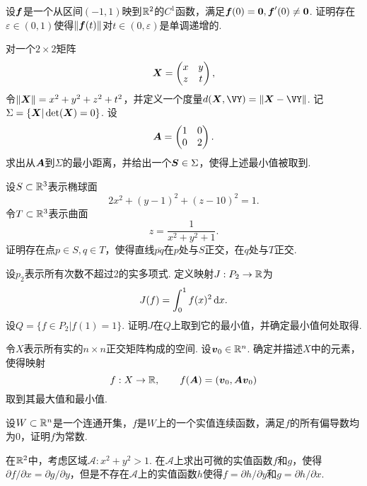 \documentclass[openany,usenames,dvipsnames]{ctexbook}
\begin{document}
\begin{example}
  设$\boldsymbol f$是一个从区间$(-1,1)$映到$\mathbb R^2$的$C^1$函数，满足$\boldsymbol f(0)=\boldsymbol 0,\boldsymbol f'(0)\ne\boldsymbol 0$. 证明存在$\varepsilon\in(0,1)$使得$\|\boldsymbol f(t)\|$对$t\in(0,\varepsilon)$是单调递增的.
\end{example}

\begin{example}
  对一个$2\times 2$矩阵
  \[
    \boldsymbol X= \begin{pmatrix}
      x & y\\ z& t
    \end{pmatrix},
  \]
  令$\|\boldsymbol X\|=x^2+y^2+z^2+t^2$，并定义一个度量$d(\VX,\VY)=\|\VX-\VY\|$. 记$\Sigma=\{\boldsymbol X|\det(\boldsymbol X)=0\}$. 设
  \[
    \boldsymbol A = \begin{pmatrix}
      1 & 0 \\ 0 & 2
    \end{pmatrix}.
  \]
  求出从$\boldsymbol A$到$\Sigma$的最小距离，并给出一个$\boldsymbol S\in\Sigma$，使得上述最小值被取到.
\end{example}

\begin{example}
  设$S\subset \mathbb R^3$表示椭球面
  \[
    2x^2+(y-1)^2+(z-10)^2=1.
  \]
  令$T\subset \mathbb R^3$表示曲面
  \[
    z= \frac1{x^2+y^2+1}.
  \]
  证明存在点$p\in S,q\in T$，使得直线$\overline{pq}$在$p$处与$S$正交，在$q$处与$T$正交.
\end{example}

\begin{example}
  设$p_2$表示所有次数不超过2的实多项式. 定义映射$J:P_2\to\mathbb R$为
  \[
    J(f) = \int_0^1f(x)^2\,\mathrm dx.
  \]
  设$Q=\{f\in P_2|f(1)=1\}$. 证明$J$在$Q$上取到它的最小值，并确定最小值何处取得.
\end{example}

\begin{example}
  令$X$表示所有实的$n\times n$正交矩阵构成的空间. 设$\boldsymbol v_0\in\mathbb R^n$. 确定并描述$X$中的元素，使得映射
  \[
    f:X\to\mathbb R,\qquad f(\boldsymbol A)=(\boldsymbol v_0,\boldsymbol A\boldsymbol v_0)
  \]
  取到其最大值和最小值.
\end{example}

\begin{example}
  设$W\subset \mathbb R^n$是一个连通开集，$f$是$W$上的一个实值连续函数，满足$f$的所有偏导数均为0，证明$f$为常数.
\end{example}

\begin{example}
  在$\mathbb R^2$中，考虑区域$\mathcal A:x^2+y^2>1$. 在$\mathcal A$上求出可微的实值函数$f$和$g$，使得$\partial f/\partial x=\partial g/\partial y$，但是不存在$\mathcal A$上的实值函数$h$使得$f=\partial h/\partial y$和$g=\partial h/\partial x$.
\end{example}
\end{document}
